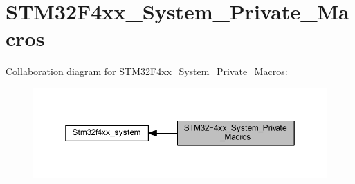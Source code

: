 \hypertarget{group___s_t_m32_f4xx___system___private___macros}{}\section{S\+T\+M32\+F4xx\+\_\+\+System\+\_\+\+Private\+\_\+\+Macros}
\label{group___s_t_m32_f4xx___system___private___macros}
Collaboration diagram for S\+T\+M32\+F4xx\+\_\+\+System\+\_\+\+Private\+\_\+\+Macros\+:\nopagebreak
\begin{figure}[H]
\begin{center}
\leavevmode
\includegraphics[width=350pt]{group___s_t_m32_f4xx___system___private___macros}
\end{center}
\end{figure}
